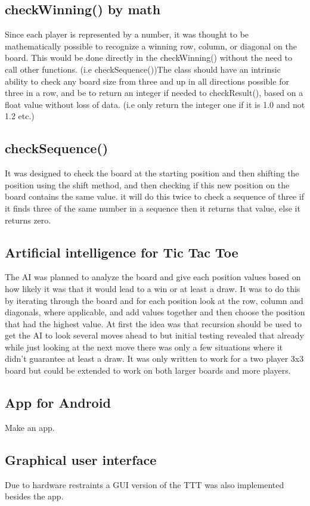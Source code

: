 \documentclass[a4paper,10pt]{article}
\begin{document}
	\subsection{checkWinning() by math}
	Since each player is represented by a number, it was thought to be mathematically possible to recognize a winning row, column, or diagonal on the board.  This would be done directly in the checkWinning() without the need to call other functions. (i.e checkSequence())The class should have an intrinsic ability to check any board size from three and up in all directions possible for three in a row, and be to return an integer if needed to checkResult(), based on a float value without loss of data.  (i.e only return the integer one if it is 1.0 and not 1.2 etc.)
	
	\subsection{checkSequence()}
	It was designed to check the board at the starting position and then shifting the position using the shift method, and then checking if this new position on the board contains the same value. it will do this twice to check a sequence of three if it finds three of the same number in a sequence then it returns that value, else it returns zero.
	\subsection{Artificial intelligence for Tic Tac Toe}
	The AI was planned to analyze the board and give each position values based on how likely it was that it would lead to a win or at least a draw. It was to do this by iterating through the board and for each position look at the row, column and diagonals, where applicable, and add values together and then choose the position that had the highest value. At first the idea was  that recursion should be used to get the AI to look several moves ahead to but initial testing revealed that already while just looking at the next move there was only a few situations where it didn’t guarantee at least a draw.
	It was only written to work for a two player 3x3 board but could be extended to work on both larger boards and more players.
	
	\subsection{App for Android}
	Make an app.
	\subsection{Graphical user interface}
	Due to hardware restraints a GUI version of the TTT was also implemented besides the app. 
	
\end{document}
